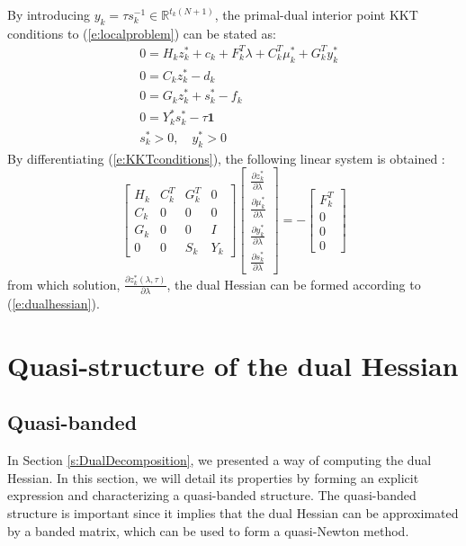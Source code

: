By introducing $y_k = \tau s_k^{-1} \in \mathbb{R}^{t_k (N + 1)}$, the primal-dual interior point KKT conditions to (\ref{e:localproblem}) can be stated as:
\begin{subequations} \label{e:KKTconditions}
\begin{align}
& 0 = H_k z_k^* + c_k + F_k^T \lambda + C_k^T \mu_k^* + G_k^T y_k^* \\
& 0 = C_k z_k^* - d_k \\
& 0 = G_k z_k^* + s_k^* - f_k \\
& 0 = Y_k^* s_k^* - \tau \mathbf{1} \\
& s_k^* > 0, \quad y_k^* > 0
\end{align}
\end{subequations}
By differentiating (\ref{e:KKTconditions}), the following linear system is obtained \cite{Klintberg2014}:
\begin{equation}
\label{e:SensitivityLambda}
\left[ \begin{array}{cccc}
H_k & C_k^T & G_k^T & 0 \\
C_k & 0 & 0 & 0 \\
G_k & 0 & 0 & I \\
0 & 0 & S_k & Y_k
\end{array} \right]
\left[ \begin{array}{c}
\frac{\partial z_k^*}{\partial \lambda} \\
\frac{\partial \mu_k^*}{\partial \lambda} \\
\frac{\partial y_k^*}{\partial \lambda} \\
\frac{\partial s_k^*}{\partial \lambda}
\end{array} \right] = -
\left[ \begin{array}{c}
F_k^T \\
0 \\
0 \\
0
\end{array} \right]
\end{equation}
from which solution, $\frac{\partial z_k^*(\lambda, \tau)}{\partial \lambda}$, the dual Hessian can be formed according to (\ref{e:dualhessian}).

\section{Quasi-structure of the dual Hessian} \label{S:TheoreticalDecay}

\subsection{Quasi-banded} \label{s:QuasiBanded}
In Section \ref{s:DualDecomposition}, we presented a way of computing the dual Hessian. In this section, we will detail its properties by forming an explicit expression and characterizing a quasi-banded structure. The quasi-banded structure is important since it implies that the dual Hessian can be approximated by a banded matrix, which can be used to form a quasi-Newton method.

